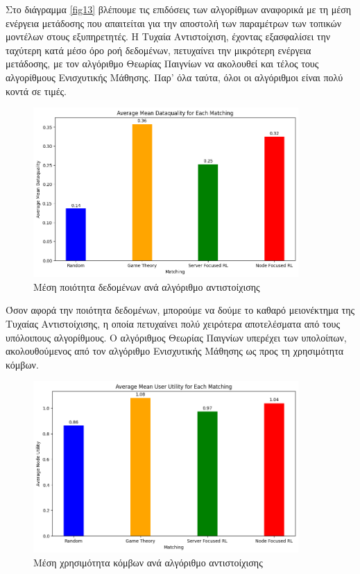 Στο διάγραμμα \ref*{fig13} βλέπουμε τις επιδόσεις των αλγορίθμων αναφορικά με τη μέση ενέργεια μετάδοσης που απαιτείται για την αποστολή των παραμέτρων των τοπικών μοντέλων στους εξυπηρετητές. Η Τυχαία Αντιστοίχιση, έχοντας εξασφαλίσει την ταχύτερη κατά μέσο όρο ροή δεδομένων, πετυχαίνει την μικρότερη ενέργεια μετάδοσης, με τον αλγόριθμο Θεωρίας Παιγνίων να ακολουθεί και τέλος τους αλγορίθμους Ενισχυτικής Μάθησης. Παρ' όλα ταύτα, όλοι οι αλγόριθμοι είναι πολύ κοντά σε τιμές.

\begin{figure}[H]
    \centering
    \includegraphics[width=0.9\textwidth]{figures/chapter3/Average_Mean_Dataquality.png}
    \caption{Μέση ποιότητα δεδομένων ανά αλγόριθμο αντιστοίχισης}
    \label{fig53}
\end{figure}

\newpage

Όσον αφορά την ποιότητα δεδομένων, μπορούμε να δούμε το καθαρό μειονέκτημα της Τυχαίας Αντιστοίχισης, η οποία πετυχαίνει πολύ χειρότερα αποτελέσματα από τους υπόλοιπους αλγορίθμους. Ο αλγόριθμος Θεωρίας Παιγνίων υπερέχει των υπολοίπων, ακολουθούμενος από τον αλγόριθμο Ενισχυτικής Μάθησης ως προς τη χρησιμότητα κόμβων.

\begin{figure}[H]
    \centering
    \includegraphics[width=0.9\textwidth]{figures/chapter3/Average_Mean_User_Utility.png}
    \caption{Μέση χρησιμότητα κόμβων ανά αλγόριθμο αντιστοίχισης}
    \label{fig14}
\end{figure}

